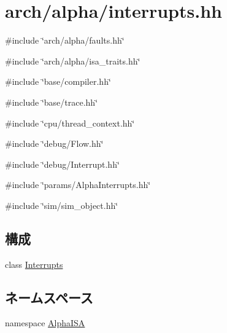 \hypertarget{alpha_2interrupts_8hh}{
\section{arch/alpha/interrupts.hh}
\label{alpha_2interrupts_8hh}
}
{\ttfamily \#include \char`\"{}arch/alpha/faults.hh\char`\"{}}\par
{\ttfamily \#include \char`\"{}arch/alpha/isa\_\-traits.hh\char`\"{}}\par
{\ttfamily \#include \char`\"{}base/compiler.hh\char`\"{}}\par
{\ttfamily \#include \char`\"{}base/trace.hh\char`\"{}}\par
{\ttfamily \#include \char`\"{}cpu/thread\_\-context.hh\char`\"{}}\par
{\ttfamily \#include \char`\"{}debug/Flow.hh\char`\"{}}\par
{\ttfamily \#include \char`\"{}debug/Interrupt.hh\char`\"{}}\par
{\ttfamily \#include \char`\"{}params/AlphaInterrupts.hh\char`\"{}}\par
{\ttfamily \#include \char`\"{}sim/sim\_\-object.hh\char`\"{}}\par
\subsection*{構成}
\begin{DoxyCompactItemize}
\item 
class \hyperlink{classAlphaISA_1_1Interrupts}{Interrupts}
\end{DoxyCompactItemize}
\subsection*{ネームスペース}
\begin{DoxyCompactItemize}
\item 
namespace \hyperlink{namespaceAlphaISA}{AlphaISA}
\end{DoxyCompactItemize}
